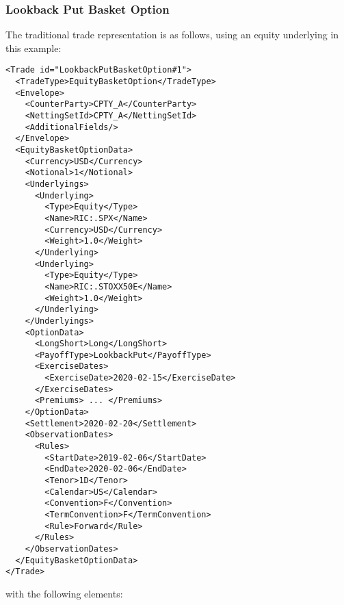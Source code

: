 \subsubsection*{Lookback Put Basket Option}

The traditional trade representation is as follows, using an equity underlying in this example:

\begin{verbatim}
<Trade id="LookbackPutBasketOption#1">
  <TradeType>EquityBasketOption</TradeType>
  <Envelope>
    <CounterParty>CPTY_A</CounterParty>
    <NettingSetId>CPTY_A</NettingSetId>
    <AdditionalFields/>
  </Envelope>
  <EquityBasketOptionData>
    <Currency>USD</Currency>
    <Notional>1</Notional>
    <Underlyings>
      <Underlying>
        <Type>Equity</Type>
        <Name>RIC:.SPX</Name>
        <Currency>USD</Currency>
        <Weight>1.0</Weight>
      </Underlying>
      <Underlying>
        <Type>Equity</Type>
        <Name>RIC:.STOXX50E</Name>
        <Weight>1.0</Weight>
      </Underlying>
    </Underlyings>
    <OptionData>
      <LongShort>Long</LongShort>
      <PayoffType>LookbackPut</PayoffType>
      <ExerciseDates>
        <ExerciseDate>2020-02-15</ExerciseDate>
      </ExerciseDates>
      <Premiums> ... </Premiums>  
    </OptionData>
    <Settlement>2020-02-20</Settlement>
    <ObservationDates>
      <Rules>
        <StartDate>2019-02-06</StartDate>
        <EndDate>2020-02-06</EndDate>
        <Tenor>1D</Tenor>
        <Calendar>US</Calendar>
        <Convention>F</Convention>
        <TermConvention>F</TermConvention>
        <Rule>Forward</Rule>
      </Rules>
    </ObservationDates>
  </EquityBasketOptionData>
</Trade>
\end{verbatim}

with the following elements:

